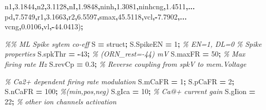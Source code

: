 \documentclass[
]{article}
\newenvironment{Shaded}{\begin{snugshade}}{\end{snugshade}}
\newcommand{\CommentTok}[1]{\textcolor[rgb]{0.56,0.35,0.01}{\textit{#1}}}
\newcommand{\FloatTok}[1]{\textcolor[rgb]{0.00,0.00,0.81}{#1}}
\newcommand{\FunctionTok}[1]{\textcolor[rgb]{0.00,0.00,0.00}{#1}}
\newcommand{\NormalTok}[1]{#1}
\newcommand{\OperatorTok}[1]{\textcolor[rgb]{0.81,0.36,0.00}{\textbf{#1}}}
\newcommand{\StringTok}[1]{\textcolor[rgb]{0.31,0.60,0.02}{#1}}
\begin{document}
\begin{Shaded}
\begin{Highlighting}[]
        \StringTok{\textquotesingle{}n1\textquotesingle{}}\OperatorTok{,}\FloatTok{3.1844}\OperatorTok{,}\StringTok{\textquotesingle{}n2\textquotesingle{}}\OperatorTok{,}\FloatTok{3.1128}\OperatorTok{,}\StringTok{\textquotesingle{}nI\textquotesingle{}}\OperatorTok{,}\FloatTok{1.9848}\OperatorTok{,}\StringTok{\textquotesingle{}ninh\textquotesingle{}}\OperatorTok{,}\FloatTok{1.3081}\OperatorTok{,}\StringTok{\textquotesingle{}ninhcng\textquotesingle{}}\OperatorTok{,}\FloatTok{1.4511}\OperatorTok{,...}
        \StringTok{\textquotesingle{}pd\textquotesingle{}}\OperatorTok{,}\FloatTok{7.5749}\OperatorTok{,}\StringTok{\textquotesingle{}r1\textquotesingle{}}\OperatorTok{,}\FloatTok{3.1663}\OperatorTok{,}\StringTok{\textquotesingle{}r2\textquotesingle{}}\OperatorTok{,}\FloatTok{6.5597}\OperatorTok{,}\StringTok{\textquotesingle{}smax\textquotesingle{}}\OperatorTok{,}\FloatTok{45.5118}\OperatorTok{,}\StringTok{\textquotesingle{}vcl\textquotesingle{}}\OperatorTok{,{-}}\FloatTok{7.7902}\OperatorTok{,...}
        \StringTok{\textquotesingle{}vcng\textquotesingle{}}\OperatorTok{,}\FloatTok{0.0106}\OperatorTok{,}\StringTok{\textquotesingle{}vl\textquotesingle{}}\OperatorTok{,{-}}\FloatTok{44.0413}\NormalTok{)}\OperatorTok{;}

\CommentTok{\%\% ML Spike sytem co{-}eff}
\NormalTok{S }\OperatorTok{=} \FunctionTok{struct}\OperatorTok{;}
\NormalTok{S.SpikeEN }\OperatorTok{=} \FloatTok{1}\OperatorTok{;} \CommentTok{\% EN=1, DL=0}
\CommentTok{\% Spike properties}
\NormalTok{S.spkThr }\OperatorTok{=} \OperatorTok{{-}}\FloatTok{43}\OperatorTok{;} \CommentTok{\% (ORN\_rest={-}44) mV}
\NormalTok{S.maxFR }\OperatorTok{=} \FloatTok{50}\OperatorTok{;} \CommentTok{\% Max firing rate Hz}
\NormalTok{S.revCp }\OperatorTok{=} \FloatTok{0.3}\OperatorTok{;} \CommentTok{\% Reverse coupling from spkV to mem.Voltage}

\CommentTok{\% Ca2+ dependent firing rate modulation }
\NormalTok{S.mCaFR }\OperatorTok{=} \FloatTok{1}\OperatorTok{;}\NormalTok{ S.pCaFR }\OperatorTok{=} \FloatTok{2}\OperatorTok{;}\NormalTok{ S.nCaFR }\OperatorTok{=} \FloatTok{100}\OperatorTok{;} \CommentTok{\%(min,pos,neg)}
\NormalTok{S.gIca }\OperatorTok{=} \FloatTok{10}\OperatorTok{;} \CommentTok{\% Ca@+ current gain}
\NormalTok{S.gIion }\OperatorTok{=} \FloatTok{22}\OperatorTok{;} \CommentTok{\% other ion channels activation}


\end{Highlighting}
\end{Shaded}
\end{document}
